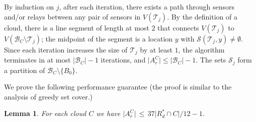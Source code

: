 \documentclass[11pt,a4paper]{article}
\newcommand{\s}[1]{{\lvert #1 \rvert}}
\newcommand{\myB}{\mathcal{B}} \newcommand{\myC}{\mathcal{C}} \newcommand{\myD}{\mathcal{D}} \newcommand{\myP}{\mathcal{P}} \newcommand{\myS}{\mathcal{S}}
\newcommand{\myT}{\mathcal{T}}
\newcommand{\optrel}{R^{*}}
\newtheorem{lemma}{Lemma}
\theoremstyle{definition}
\theoremstyle{remark}
\begin{document}
By induction on $j$, after each iteration, there exists a path through sensors and/or relays between any pair of sensors in $V(\myT_j)$. By the definition of a cloud, there is a line segment of length at most $2$ that connects $V(\myT_j)$ to $V(\myB_C \setminus \myT_j)$; the midpoint of the segment is a location $y$ with $\myS(\myT_j,y) \ne \emptyset$. Since each iteration increases the size of $\myT_j$ by at least $1$, the algorithm terminates in at most $\s{\myB_C}-1$ iterations, and $\s{A_r^C} \le \s{\myB_C} - 1$.  The sets $\myS_j$ form a partition of $\myB_C \setminus \{ B_0 \}$.

We prove the following performance guarantee (the proof is similar to the analysis of greedy set cover.)

\begin{lemma}\label{lem:stitching}
    For each cloud\/ $C$ we have\/ $\s{A_r^C} \, \le \, 37 \s{\optrel_d \cap C} / 12 - 1$.
\end{lemma}
\end{document}
